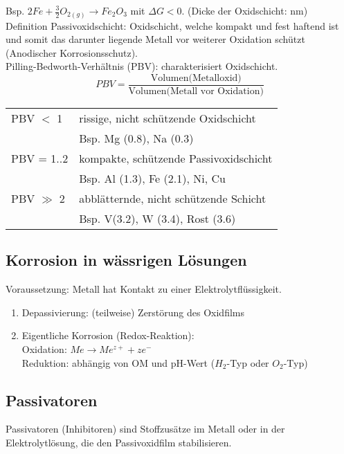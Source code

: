 Bsp. $2Fe + \frac{3}{2} O_{2(g)} \rightarrow Fe_2O_3$ mit $\Delta G < 0$. (Dicke der Oxidschicht: nm) \\

Definition Passivoxidschicht: Oxidschicht, welche kompakt und fest haftend ist und somit das darunter liegende Metall vor weiterer Oxidation schützt (Anodischer Korrosionsschutz). \\

Pilling-Bedworth-Verhältnis (PBV): charakterisiert Oxidschicht.
\begin{equation*}
	PBV = \frac{\text{Volumen(Metalloxid)}}{\text{Volumen(Metall vor Oxidation)}}
\end{equation*}
\begin{table}[htbp]
	\begin{tabular}{ll}
		PBV $<$ 1 & rissige, nicht schützende Oxidschicht \\ & Bsp. Mg (0.8), Na (0.3)\\
		PBV = 1..2 & kompakte, schützende Passivoxidschicht \\ & Bsp. Al (1.3), Fe (2.1), Ni, Cu\\
		PBV $\gg$ 2 & abblätternde, nicht schützende Schicht \\ & Bsp. V(3.2), W (3.4), Rost (3.6) \\
	\end{tabular}
\end{table}

\subsection{Korrosion in wässrigen Lösungen}
Voraussetzung: Metall hat Kontakt zu einer Elektrolytflüssigkeit. 

\begin{enumerate}
	\item Depassivierung: (teilweise) Zerstörung des Oxidfilms
	\item Eigentliche Korrosion (Redox-Reaktion): \\
		Oxidation: $Me \rightarrow Me^{z+} + z e^-$ \\
		Reduktion: abhängig von OM und pH-Wert ($H_2$-Typ oder $O_2$-Typ)
\end{enumerate}

\subsection{Passivatoren}
Passivatoren (Inhibitoren) sind Stoffzusätze im Metall oder in der Elektrolytlösung, die den Passivoxidfilm stabilisieren. \\

